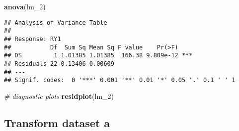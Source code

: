 \documentclass[]{book}
\newenvironment{Shaded}{\begin{snugshade}}{\end{snugshade}}
\newcommand{\CommentTok}[1]{\textcolor[rgb]{0.56,0.35,0.01}{\textit{#1}}}
\newcommand{\DecValTok}[1]{\textcolor[rgb]{0.00,0.00,0.81}{#1}}
\newcommand{\KeywordTok}[1]{\textcolor[rgb]{0.13,0.29,0.53}{\textbf{#1}}}
\newcommand{\NormalTok}[1]{#1}
\begin{document}
\begin{Shaded}
\begin{Highlighting}[]
\KeywordTok{anova}\NormalTok{(lm_}\DecValTok{2}\NormalTok{)}
\end{Highlighting}
\end{Shaded}

\begin{verbatim}
## Analysis of Variance Table
## 
## Response: RY1
##           Df  Sum Sq Mean Sq F value    Pr(>F)    
## DS         1 1.01385 1.01385  166.38 9.809e-12 ***
## Residuals 22 0.13406 0.00609                      
## ---
## Signif. codes:  0 '***' 0.001 '**' 0.01 '*' 0.05 '.' 0.1 ' ' 1
\end{verbatim}

\begin{Shaded}
\begin{Highlighting}[]
\CommentTok{# diagnostic plots  }
\KeywordTok{residplot}\NormalTok{(lm_}\DecValTok{2}\NormalTok{)}
\end{Highlighting}
\end{Shaded}

\hypertarget{transform-dataset-a}{%
\subsection{Transform dataset a}\label{transform-dataset-a}}
\end{document}
